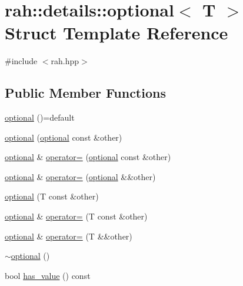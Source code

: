 \hypertarget{structrah_1_1details_1_1optional}{}\section{rah\+::details\+::optional$<$ T $>$ Struct Template Reference}
\label{structrah_1_1details_1_1optional}


{\ttfamily \#include $<$rah.\+hpp$>$}

\subsection*{Public Member Functions}
\begin{DoxyCompactItemize}
\item 
\mbox{\hyperlink{structrah_1_1details_1_1optional_a6804687765e89a112e42257aa322b66a}{optional}} ()=default
\item 
\mbox{\hyperlink{structrah_1_1details_1_1optional_a95c8f29ac31c32ff4c91c1931aa36e3b}{optional}} (\mbox{\hyperlink{structrah_1_1details_1_1optional}{optional}} const \&other)
\item 
\mbox{\hyperlink{structrah_1_1details_1_1optional}{optional}} \& \mbox{\hyperlink{structrah_1_1details_1_1optional_aa077fc53221fc2fbc4a444a0e9ab28d1}{operator=}} (\mbox{\hyperlink{structrah_1_1details_1_1optional}{optional}} const \&other)
\item 
\mbox{\hyperlink{structrah_1_1details_1_1optional}{optional}} \& \mbox{\hyperlink{structrah_1_1details_1_1optional_a0d5ac07cf78e2054a6484c43dbe72734}{operator=}} (\mbox{\hyperlink{structrah_1_1details_1_1optional}{optional}} \&\&other)
\item 
\mbox{\hyperlink{structrah_1_1details_1_1optional_ab1f11335a6ba255db2f22a49ed34d984}{optional}} (T const \&other)
\item 
\mbox{\hyperlink{structrah_1_1details_1_1optional}{optional}} \& \mbox{\hyperlink{structrah_1_1details_1_1optional_a710769ec58836829924e64354b000e6f}{operator=}} (T const \&other)
\item 
\mbox{\hyperlink{structrah_1_1details_1_1optional}{optional}} \& \mbox{\hyperlink{structrah_1_1details_1_1optional_aa9405bb93c88cf4dbcfae1c69d988a6d}{operator=}} (T \&\&other)
\item 
\mbox{\hyperlink{structrah_1_1details_1_1optional_acb7b6527ddc6fdf1d43aabc74dcfeb36}{$\sim$optional}} ()
\item 
bool \mbox{\hyperlink{structrah_1_1details_1_1optional_a41a329706e586e41b748c7881252f121}{has\+\_\+value}} () const

\end{DoxyCompactItemize}
